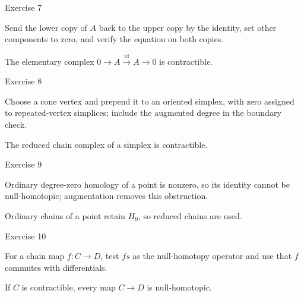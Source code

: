 \begin{exercise}\label{exr:viii23-07}
Exercise 7
\end{exercise}
\begin{hint}
Send the lower copy of \(A\) back to the upper copy by the identity, set other components to zero, and verify the equation on both copies.
\end{hint}
\begin{solution}
The elementary complex \(0\to A\xrightarrow{\mathrm{id}}A\to0\) is contractible.
\end{solution}

\begin{exercise}\label{exr:viii23-08}
Exercise 8
\end{exercise}
\begin{hint}
Choose a cone vertex and prepend it to an oriented simplex, with zero assigned to repeated-vertex simplices; include the augmented degree in the boundary check.
\end{hint}
\begin{solution}
The reduced chain complex of a simplex is contractible.
\end{solution}

\begin{exercise}\label{exr:viii23-09}
Exercise 9
\end{exercise}
\begin{hint}
Ordinary degree-zero homology of a point is nonzero, so its identity cannot be null-homotopic; augmentation removes this obstruction.
\end{hint}
\begin{solution}
Ordinary chains of a point retain \(H_0\), so reduced chains are used.
\end{solution}

\begin{exercise}\label{exr:viii23-10}
Exercise 10
\end{exercise}
\begin{hint}
For a chain map \(f:C\to D\), test \(fs\) as the null-homotopy operator and use that \(f\) commutes with differentials.
\end{hint}
\begin{solution}
If \(C\) is contractible, every map \(C\to D\) is null-homotopic.
\end{solution}

